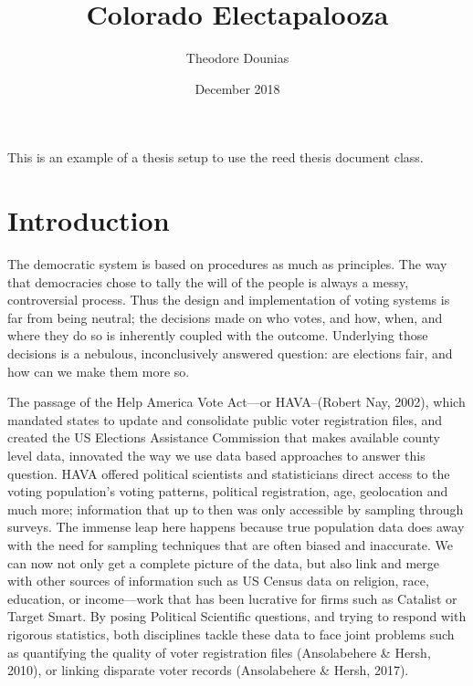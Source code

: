\documentclass[12pt,twoside]{reedthesis}
\title{Colorado Electapalooza}
\author{Theodore Dounias}
\date{December 2018}
\begin{document}
      \maketitle
  
  \frontmatter %
  \pagestyle{empty} %

  
      \begin{preface}
      This is an example of a thesis setup to use the reed thesis document
      class.
    \end{preface}
  
      \hypersetup{linkcolor=black}
    \setcounter{tocdepth}{3}
    \tableofcontents
  
      \listoftables
  
      \listoffigures
  
  
  
  \mainmatter %
  \pagestyle{fancyplain} %

  \chapter*{Introduction}\label{introduction}
  
  The democratic system is based on procedures as much as principles. The
  way that democracies chose to tally the will of the people is always a
  messy, controversial process. Thus the design and implementation of
  voting systems is far from being neutral; the decisions made on who
  votes, and how, when, and where they do so is inherently coupled with
  the outcome. Underlying those decisions is a nebulous, inconclusively
  answered question: are elections fair, and how can we make them more so.
  
  The passage of the Help America Vote Act---or HAVA--(Robert Nay, 2002),
  which mandated states to update and consolidate public voter
  registration files, and created the US Elections Assistance Commission
  that makes available county level data, innovated the way we use data
  based approaches to answer this question. HAVA offered political
  scientists and statisticians direct access to the voting population's
  voting patterns, political registration, age, geolocation and much more;
  information that up to then was only accessible by sampling through
  surveys. The immense leap here happens because true population data does
  away with the need for sampling techniques that are often biased and
  inaccurate. We can now not only get a complete picture of the data, but
  also link and merge with other sources of information such as US Census
  data on religion, race, education, or income---work that has been
  lucrative for firms such as Catalist or Target Smart. By posing
  Political Scientific questions, and trying to respond with rigorous
  statistics, both disciplines tackle these data to face joint problems
  such as quantifying the quality of voter registration files
  (Ansolabehere \& Hersh, 2010), or linking disparate voter records
  (Ansolabehere \& Hersh, 2017).
  
\end{document}
